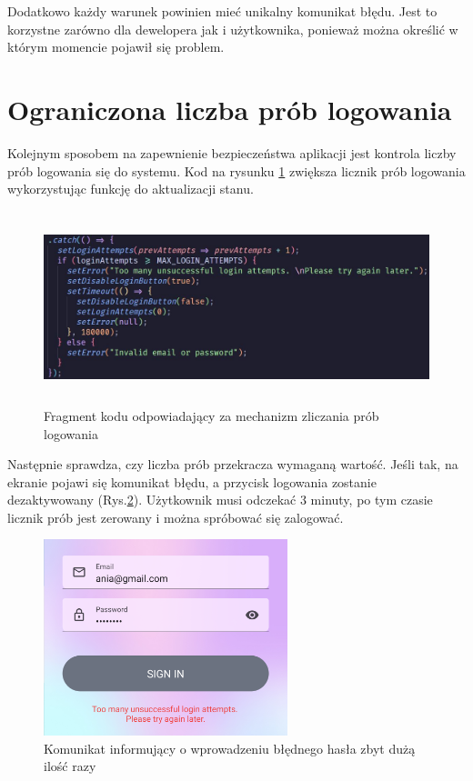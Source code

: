 Dodatkowo każdy warunek powinien mieć unikalny komunikat błędu. Jest to korzystne zarówno dla dewelopera jak i użytkownika, ponieważ można określić w którym momencie pojawił się problem.


\section*{Ograniczona liczba prób logowania}
Kolejnym sposobem na zapewnienie bezpieczeństwa aplikacji jest kontrola liczby prób logowania się do systemu. Kod na rysunku \ref{fig:LiczbaProb} zwiększa licznik prób logowania wykorzystując funkcję do aktualizacji stanu.

\begin{figure}[ht]
	\centering
	\includegraphics[height=5.6cm]{images/bezpieczenstwo/liczba_prob_kod}
	\caption{Fragment kodu odpowiadający za mechanizm zliczania prób logowania}
	\label{fig:LiczbaProb}
\end{figure}

 Następnie sprawdza, czy liczba prób przekracza wymaganą wartość. Jeśli tak, na ekranie pojawi się komunikat błędu, a przycisk logowania zostanie dezaktywowany (Rys.\ref{fig:Blad}). Użytkownik musi odczekać 3 minuty, po tym czasie licznik prób jest zerowany i można spróbować się zalogować.
\begin{figure}[H]
	\centering
	\vspace{0.25cm}
	\includegraphics[height=5.7cm]{images/bezpieczenstwo/blad}
	\caption{Komunikat informujący o wprowadzeniu błędnego hasła zbyt dużą ilość razy}
	\label{fig:Blad}
\end{figure}


